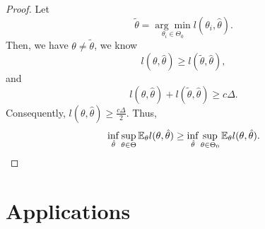 \begin{proof}
	Let
	\begin{equation*}
		\tilde{\theta}=\underset{\theta_{i}\in\Theta_{0}}{\arg\min}l(\theta_{i},\hat{\theta}).
	\end{equation*}
	Then, we have $\theta\neq\tilde{\theta}$, we know
	\begin{equation*}
		l(\theta,\hat{\theta})\geq l(\tilde{\theta},\hat{\theta}),
	\end{equation*}
	and
	\begin{equation*}
		l(\theta,\hat{\theta})+l(\tilde{\theta},\hat{\theta})\geq c\Delta.
	\end{equation*}
	Consequently, $l(\theta,\hat{\theta})\geq\frac{c\Delta}{2}$. Thus,
	\begin{equation*}
		\inf_{\hat{\theta}}\sup_{\theta\in\Theta}{\mathbb E}_{\theta}l(\theta,\hat{\theta})\geq\inf_{\hat{\theta}}\sup_{\theta\in\Theta_{0}}{\mathbb E}_{\theta}l(\theta,\hat{\theta}).
	\end{equation*}
\end{proof}

\section{Applications}

